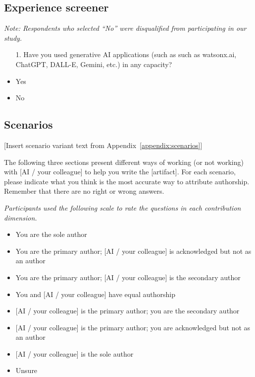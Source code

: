

\subsection{Experience screener}
\label{survey-screener}

\textit{Note: Respondents who selected ``No'' were disqualified from participating in our study.}

\begin{itemize}[leftmargin=0pt, itemindent=2em]
    \item[1.] Have you used generative AI applications (such as such as watsonx.ai, ChatGPT, DALL-E, Gemini, etc.) in any capacity?
    \item Yes
    \item No
\end{itemize}

\subsection{Scenarios}
\label{survey-scenarios}

[Insert scenario variant text from Appendix~\ref{appendix:scenarios}]

The following three sections present different ways of working (or not working) with [AI / your colleague] to help you write the [artifact]. For each scenario, please indicate what you think is the most accurate way to attribute authorship. Remember that there are no right or wrong answers.

\textit{Participants used the following scale to rate the questions in each contribution dimension.}

\begin{itemize}
    \item You are the sole author
    \item You are the primary author; [AI / your colleague] is acknowledged but not as an author
    \item You are the primary author; [AI / your colleague] is the secondary author
    \item You and [AI / your colleague] have equal authorship
    \item {[AI / your colleague]} is the primary author; you are the secondary author
    \item {[AI / your colleague]} is the primary author; you are acknowledged but not as an author
    \item {[AI / your colleague]} is the sole author
    \item Unsure
\end{itemize}

